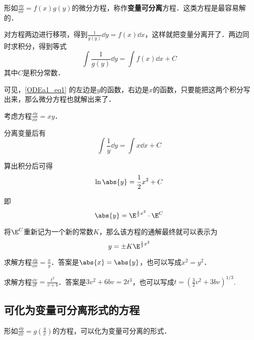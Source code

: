 
形如$\frac{\dd y}{\dd x}=f(x)g(y)$的微分方程，称作\textbf{变量可分离}方程．这类方程是最容易解的．

对方程两边进行移项，得到$\frac{1}{g(y)}\dd y=f(x)\dd x$，这样就把变量分离开了．两边同时求积分，得到等式
\begin{equation}\label{ODEa1_eq1}
\int\frac{1}{g(y)}\dd y=\int f(x)\dd x+C
\end{equation}
其中$C$是积分常数．

可见，\autoref{ODEa1_eq1} 的左边是$y$的函数，右边是$x$的函数，只要能把这两个积分写出来，那么微分方程也就解出来了．

\begin{example}{}
考虑方程$\frac{\dd y}{\dd x}=xy$．

分离变量后有
\begin{equation}
\int\frac{1}{y}\dd y=\int x\dd x+C
\end{equation}

算出积分后可得
\begin{equation}
\ln\abs{y}=\frac{1}{2}x^2+C
\end{equation}

即
\begin{equation}
\abs{y}=\E^{\frac{1}{2}x^2}\cdot\E^C
\end{equation}

将$\E^C$重新记为一个新的常数$K$，那么该方程的通解最终就可以表示为
\begin{equation}
y=\pm K\E^{\frac{1}{2}x^2}
\end{equation}
\end{example}

\begin{exercise}{}
求解方程$\frac{\dd y}{\dd x}=\frac{x}{y}$．答案是$\abs{x}=\abs{y}$，也可以写成$x^2=y^2$．
\end{exercise}

\begin{exercise}{}
求解方程$\frac{\dd v}{\dd t}=\frac{t^2}{v+b}$．答案是$3v^2+6bv=2t^3$，也可以写成$t=(\frac{3}{2}v^2+3bv)^{1/3}$.
\end{exercise}

\subsection{可化为变量可分离形式的方程}

\begin{theorem}{}\label{ODEa1_the1}
形如$\frac{\dd y}{\dd x}=g(\frac{y}{x})$的方程，可以化为变量可分离的形式．
\end{theorem}

